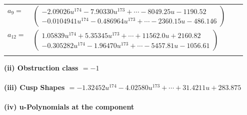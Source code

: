 \documentclass[1p]{elsarticle_modified}
\theoremstyle{definition}
\begin{document}
\begin{tabular}{m{7pt} m{180pt} m{7pt} m{180pt} }
\flushright $a_{9}=$&$\begin{pmatrix}-2.09026 u^{174}-7.90330 u^{173}+\cdots-8049.25 u-1190.52\\-0.0104941 u^{174}-0.486964 u^{173}+\cdots-2360.15 u-486.146\end{pmatrix}$ \\
\flushright $a_{12}=$&$\begin{pmatrix}1.05839 u^{174}+5.35345 u^{173}+\cdots+11562.0 u+2160.82\\-0.305282 u^{174}-1.96470 u^{173}+\cdots-5457.81 u-1056.61\end{pmatrix}$\\&\end{tabular}
\flushleft \textbf{(ii) Obstruction class $= -1$}\\~\\
\flushleft \textbf{(iii) Cusp Shapes $= -1.32452 u^{174}-4.02580 u^{173}+\cdots+31.4211 u+283.875$}\\~\\
\newpage\renewcommand{\arraystretch}{1}
\flushleft \textbf{(iv) u-Polynomials at the component}\newline \\
\end{document}
